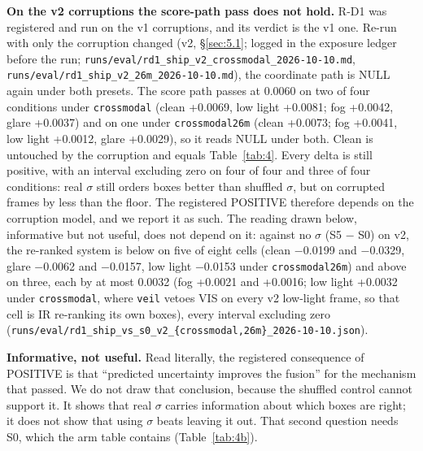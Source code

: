 \documentclass[10pt]{article}
\begin{document}
\textbf{On the v2 corruptions the score-path pass does not hold.} R-D1 was registered and run on the v1 corruptions, and its verdict is the v1 one. Re-run with only the corruption changed (v2, \S\ref{sec:5.1}; logged in the exposure ledger before the run; \texttt{runs/\allowbreak{}eval/\allowbreak{}rd1\_\allowbreak{}ship\_\allowbreak{}v2\_\allowbreak{}crossmodal\_\allowbreak{}2026-10-10.md}, \texttt{runs/\allowbreak{}eval/\allowbreak{}rd1\_\allowbreak{}ship\_\allowbreak{}v2\_\allowbreak{}26m\_\allowbreak{}2026-10-10.md}), the coordinate path is NULL again under both presets. The score path passes at 0.0060 on two of four conditions under \texttt{crossmodal} (clean +0.0069, low light +0.0081; fog +0.0042, glare +0.0037) and on one under \texttt{crossmodal26m} (clean +0.0073; fog +0.0041, low light +0.0012, glare +0.0029), so it reads NULL under both. Clean is untouched by the corruption and equals Table~\ref{tab:4}. Every delta is still positive, with an interval excluding zero on four of four and three of four conditions: real $\sigma$ still orders boxes better than shuffled $\sigma$, but on corrupted frames by less than the floor. The registered POSITIVE therefore depends on the corruption model, and we report it as such. The reading drawn below, informative but not useful, does not depend on it: against no $\sigma$ (S5 $-$ S0) on v2, the re-ranked system is below on five of eight cells (clean $-$0.0199 and $-$0.0329, glare $-$0.0062 and $-$0.0157, low light $-$0.0153 under \texttt{crossmodal26m}) and above on three, each by at most 0.0032 (fog +0.0021 and +0.0016; low light +0.0032 under \texttt{crossmodal}, where \texttt{veil} vetoes VIS on every v2 low-light frame, so that cell is IR re-ranking its own boxes), every interval excluding zero (\texttt{runs/\allowbreak{}eval/\allowbreak{}rd1\_\allowbreak{}ship\_\allowbreak{}vs\_\allowbreak{}s0\_\allowbreak{}v2\_\allowbreak{}\{crossmodal,26m\}\_\allowbreak{}2026-10-10.json}).

\textbf{Informative, not useful.} Read literally, the registered consequence of POSITIVE is that ``predicted uncertainty improves the fusion'' for the mechanism that passed. We do not draw that conclusion, because the shuffled control cannot support it. It shows that real $\sigma$ carries information about which boxes are right; it does not show that using $\sigma$ beats leaving it out. That second question needs S0, which the arm table contains (Table~\ref{tab:4b}).
\end{document}
